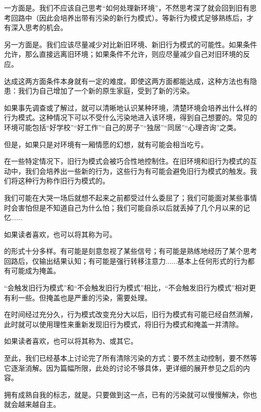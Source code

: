 一方面是。我们不应该自己思考“如何处理新环境”，不然思考深了就会回到旧有思考回路中（因此会培养出带有污染的新行为模式）。等新行为模式足够熟练后，才有深入思考的机会。

另一方面是。我们应该尽量减少对比新旧环境、新旧行为模式的可能性。如果条件允许，那么直接远离旧环境；如果条件不允许，则应尽量减少自己对旧环境的反应。

达成这两方面条件本身就有一定的难度。即使这两方面都能达成，这种方法也有隐患：我们为自己增加了一个新的原生家庭，受到了新的污染。
\begin{explain}
如果事先调查或了解过，就可以清晰地认识某种环境，清楚环境会培养出什么样的行为模式。这种情况下可以不受什么污染地进入该环境，得到自己想要的。常见的环境可能包括“好学校”“好工作”“自己的房子”“独居”“同居”“心理咨询”之类。

但是，如果只是对环境有一厢情愿的幻想，就有可能会相当吃亏。
\end{explain}
在一些特定情况下，旧行为模式会被巧合性地控制住。在旧环境和旧行为模式的互动中，我们会培养出一些新的行为，这些行为有可能会避免旧行为模式的触发。我们将这种行为称作旧行为模式的。
\begin{examples}
我们可能在大哭一场后就想不起来之前都受过什么委屈了；我们可能面对某些事情时会害怕但是不知道自己为什么怕；我们可能自杀以后就丢掉了几个月以来的记忆......

如果读者喜欢，也可以将其称为可。

的形式十分多样。有可能是刻意忽视了某些信号；有可能是熟练地经历了某个思考回路后，仅输出结果认知；有可能是强行转移注意力......基本上任何形式的行为都有可能成为掩盖。
\end{examples}
“会触发旧行为模式”和“不会触发旧行为模式”相比，“不会触发旧行为模式”相对更有利一些。但掩盖也是严重的污染，需要处理。
\begin{explain}
在时间经过充分久，行为模式改变充分大以后，旧行为模式有可能已经自然消解，此时就可以使用理性来重新发现旧行为模式，将旧行为模式和掩盖一并清除。

如果读者喜欢，也可以将其称为、或其它。
\end{explain}
至此，我们已经基本上讨论完了所有清除污染的方式：要不然主动控制，要不然等它逐渐消解。因为篇幅所限，此处的讨论不够具体，更详细的展开参见之后的内容。

拥有成熟自我的标志，就是。只要做到这一点，已有的污染就可以慢慢解决，你也就会越来越自主。